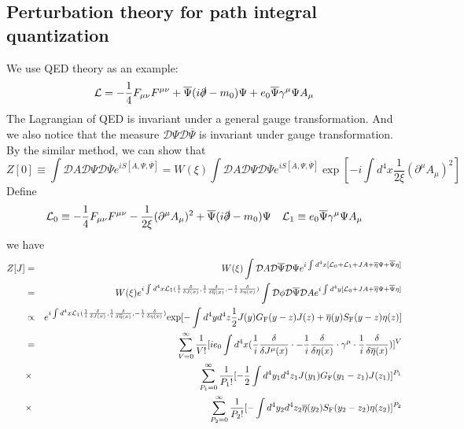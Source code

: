 \subsection{Perturbation theory for path integral quantization}
\noindent
We use QED theory as an example:
\[\mathcal{L} = -\frac{1}{4}F_{\mu\nu}F^{\mu\nu} + \overline{\Psi} (i\slashed{\partial}-m_0) \Psi + e_0\overline{\Psi}\gamma^{\mu}\Psi A_{\mu}\]
The Lagrangian of QED is invariant under a general gauge transformation. 
And we also notice that the measure $\mathcal{D}\Psi \mathcal{D}\overline{\Psi}$ is invariant under gauge transformation.
By the similar method, we can show that
\[Z[0] \equiv \int \mathcal{D}A \mathcal{D}\Psi \mathcal{D}\overline{\Psi}e^{iS[A,\Psi,\overline{\Psi}]} = W(\xi)\int \mathcal{D}A \mathcal{D}\Psi \mathcal{D}\overline{\Psi}e^{iS[A,\Psi,\overline{\Psi}]} \exp\left[ -i \int d^4x \frac{1}{2\xi} (\partial^{\mu}A_{\mu})^2\right] \]
Define
\[\mathcal{L}_0 \equiv -\frac{1}{4}F_{\mu\nu}F^{\mu\nu} - \frac{1}{2\xi} (\partial^{\mu}A_{\mu})^2 + \overline{\Psi} (i\slashed{\partial}-m_0) \Psi \quad \mathcal{L}_1 \equiv e_0\overline{\Psi}\gamma^{\mu}\Psi A_{\mu}\]
we have
\begin{eqnarray}
Z[J] &=& W(\xi) \int \mathcal{D}A \mathcal{D}\overline{\Psi} \mathcal{D}\Psi e^{i\int d^4x [\mathcal{L}_0 + \mathcal{L}_1 + JA + \overline{\eta}\Psi + \overline{\Psi}\eta]} \nonumber \\
&=& W(\xi) e^{i\int d^4x \mathcal{L}_1(\frac{1}{i} \frac{\delta}{\delta J(x)},\frac{1}{i}\frac{\delta}{\delta \overline{\eta}(x)},-\frac{1}{i}\frac{\delta}{\delta \eta(x)})} \int \mathcal{D}\phi \mathcal{D}\overline{\Psi} \mathcal{D}A e^{i\int d^4y [\mathcal{L}_0 + JA + \overline{\eta}\Psi + \overline{\Psi}\eta]} \nonumber \\
&\propto & e^{i\int d^4x \mathcal{L}_1(\frac{1}{i} \frac{\delta}{\delta J(x)},\frac{1}{i}\frac{\delta}{\delta \overline{\eta}(x)},-\frac{1}{i}\frac{\delta}{\delta \eta(x)})} \mathrm{exp} [- \int d^4y d^4z  \frac{1}{2} J(y)G_{\rm F}(y-z)J(z) + \overline{\eta}(y)S_{\rm F}(y-z)\eta(z)] \nonumber \\
& =& \sum_{V=0}^{\infty} \frac{1}{V!} [ie_0 \int d^4x (\frac{1}{i} \frac{\delta}{\delta J^{\mu}(x)} \cdot -\frac{1}{i}\frac{\delta}{\delta \eta(x)} \cdot \gamma^{\mu} \cdot  \frac{1}{i}\frac{\delta}{\delta \overline{\eta}(x)})]^V \nonumber \\
&\times & \sum_{P_1=0}^{\infty} \frac{1}{P_1!} [-\frac{1}{2} \int d^4y_1 d^4z_1 J(y_1)G_{\rm F}(y_1-z_1)J(z_1)]^{P_1} \nonumber \\
&\times &  \sum_{P_2=0}^{\infty} \frac{1}{P_2!} [-\int d^4y_2 d^4z_2 \overline{\eta}(y_2)S_{\rm F}(y_2-z_2)\eta(z_2)]^{P_2} \nonumber
\end{eqnarray}
